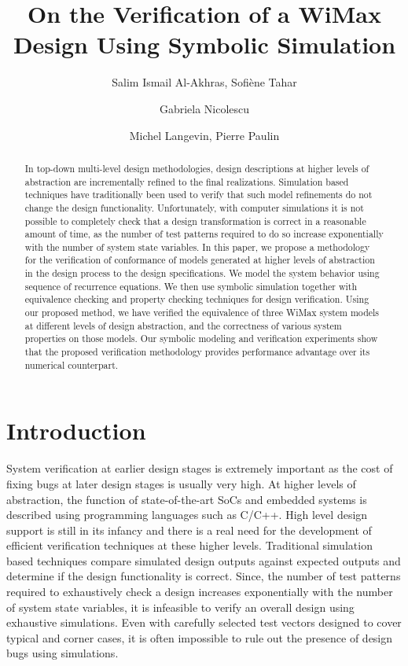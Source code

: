\documentclass[submission,copyright,creativecommons]{eptcs}
\title{On the Verification of a WiMax Design Using Symbolic Simulation}
\author{Salim Ismail Al-Akhras, Sofi\`{e}ne Tahar
\institute{ECE Department, Concordia University, \\ Montreal, QC, Canada}
\email{\{s\_alakhr,tahar\}@encs.concordia.ca}
\and
Gabriela Nicolescu
\institute{CSE Department, Ecole Polytechnique de Montreal,\\ Montreal, QC, Canada}
\email{gabriela.nicolescu@polymtl.ca }
\and
Michel Langevin, Pierre Paulin
\institute{STMicroelectronics Inc., Ottawa, ON, Canada}
\email{\{michel.langevin,pierre.paulin\}@st.com }
}
\begin{document}
\maketitle

\begin{abstract}
In top-down multi-level design methodologies, design descriptions at higher levels of abstraction are incrementally refined to the final realizations. Simulation based techniques have traditionally been used to verify that such model refinements do not change the design functionality. Unfortunately, with computer simulations it is not possible to completely check that a design transformation is correct in a reasonable amount of time, as the number of test patterns required to do so increase exponentially with the number of system state variables. In this paper, we propose a methodology for the verification of conformance of models generated at higher levels of abstraction in the design process to the design specifications. We model the system behavior using sequence of recurrence equations. We then use symbolic simulation together with equivalence checking and property checking techniques for design verification. Using our proposed method, we have verified the equivalence of three WiMax system models at different levels of design abstraction, and the correctness of various system properties on those models. Our symbolic modeling and verification experiments show that the proposed verification methodology provides performance advantage over its numerical counterpart.
\end{abstract}

\renewcommand*{\arraystretch}{1.5}

\section{Introduction}
\label{intro_sec}
System verification at earlier design stages is extremely important as the cost of fixing bugs at later design stages is usually very high. At higher levels of abstraction, the function of state-of-the-art SoCs and embedded systems is described using programming languages such as C/C++. High level design support is still in its infancy and there is a real need for the development of efficient verification techniques at these higher levels. Traditional simulation based techniques compare simulated design outputs against expected outputs and determine if the design functionality is correct. Since, the number of test patterns required to exhaustively check a design increases exponentially with the number of system state variables, it is infeasible to verify an overall design using exhaustive simulations. Even with carefully selected test vectors designed to cover typical and corner cases, it is often impossible to rule out the presence of design bugs using simulations.
\end{document}
